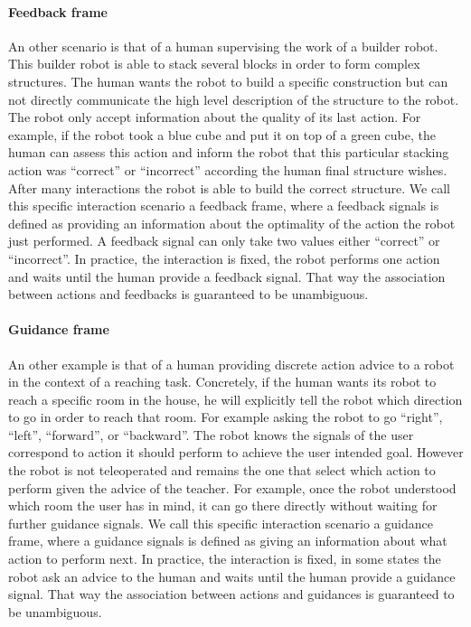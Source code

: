 \paragraph{Feedback frame}
An other scenario is that of a human supervising the work of a builder robot. This builder robot is able to stack several blocks in order to form complex structures. The human wants the robot to build a specific construction but can not directly communicate the high level description of the structure to the robot. The robot only accept information about the quality of its last action. For example, if the robot took a blue cube and put it on top of a green cube, the human can assess this action and inform the robot that this particular stacking action was ``correct'' or ``incorrect'' according the human final structure wishes. After many interactions the robot is able to build the correct structure. We call this specific interaction scenario a feedback frame, where a feedback signals is defined as providing an information about the optimality of the action the robot just performed. A feedback signal can only take two values either ``correct'' or ``incorrect''. In practice, the interaction is fixed, the robot performs one action and waits until the human provide a feedback signal. That way the association between actions and feedbacks is guaranteed to be unambiguous.

\paragraph{Guidance frame} An other example is that of a human providing discrete action advice to a robot in the context of a reaching task. Concretely, if the human wants its robot to reach a specific room in the house, he will explicitly tell the robot which direction to go in order to reach that room. For example asking the robot to go ``right'', ``left'', ``forward'', or ``backward''. The robot knows the signals of the user correspond to action it should perform to achieve the user intended goal. However the robot is not teleoperated and remains the one that select which action to perform given the advice of the teacher. For example, once the robot understood which room the user has in mind, it can go there directly without waiting for further guidance signals. We call this specific interaction scenario a guidance frame, where a guidance signals is defined as giving an information about what action to perform next. In practice, the interaction is fixed, in some states the robot  ask an advice to the human and waits until the human provide a guidance signal. That way the association between actions and guidances is guaranteed to be unambiguous.


